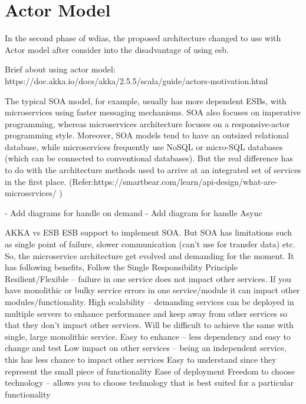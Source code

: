 \section{Actor Model}

In the second phase of \acrshort{wdias}, the proposed architecture changed to use with Actor model after consider into the disadvantage of using \acrshort{esb}.

Brief about using actor model:
https://doc.akka.io/docs/akka/2.5.5/scala/guide/actors-motivation.html

The typical SOA model, for example, usually has more dependent ESBs, with microservices using faster messaging mechanisms.  SOA also focuses on imperative programming, whereas microservices architecture focuses on a responsive-actor programming style.  Moreover, SOA models tend to have an outsized relational database, while microservices frequently use NoSQL or micro-SQL databases (which can be connected to conventional databases).  But the real difference has to do with the architecture methods used to arrive at an integrated set of services in the first place. (Refer:https://smartbear.com/learn/api-design/what-are-microservices/ )

- Add diagrams for handle on demand
- Add diagram for handle Async


AKKA vs ESB
ESB support to implement SOA. But SOA has limitations such as single point of failure, slower communication (can’t use for transfer data) etc. So, the microservice architecture get evolved and demanding for the moment. It has following benefits,
Follow the Single Responsibility Principle
Resilient/Flexible – failure in one service does not impact other services. If you have monolithic or bulky service errors in one service/module it can impact other modules/functionality.
High scalability – demanding services can be deployed in multiple servers to enhance performance and keep away from other services so that they don’t impact other services. Will be difficult to achieve the same with single, large monolithic service.
Easy to enhance – less dependency and easy to change and test
Low impact on other services – being an independent service, this has less chance to impact other services
Easy to understand since they represent the small piece of functionality
Ease of deployment
Freedom to choose technology – allows you to choose technology that is best suited for a particular functionality
